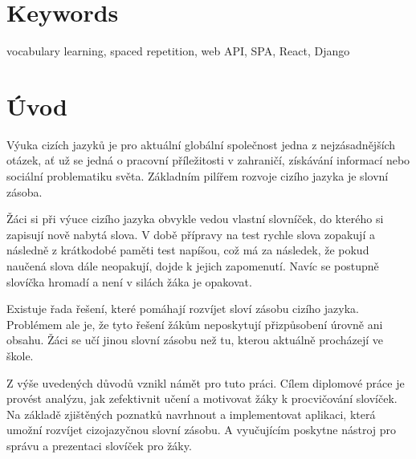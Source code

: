 \documentclass[a4paper,11pt,titlepage,fleqn]{article}
\begin{document}

\section*{Keywords}
vocabulary learning, spaced repetition, web API, SPA, React, Django

\thispagestyle{empty}

\newpage
\thispagestyle{empty}
\setcounter{tocdepth}{2}
\tableofcontents


\newpage
\thispagestyle{empty}
\listoffigures
\listoftables
\renewcommand{\lstlistingname}{Ukázka kódu}
\renewcommand{\lstlistlistingname}{Seznam ukázek zdrojových kódů}
\lstlistoflistings

\newpage
\thispagestyle{empty}
\printglossary[title=Seznam zkratek]
\cleardoublepage

\section{Úvod}
    Výuka cizích jazyků je pro aktuální globální společnost jedna z nejzásadnějších otázek, ať už se jedná o pracovní příležitosti v zahraničí, získávání informací nebo sociální problematiku světa. Základním pilířem rozvoje cizího jazyka je slovní zásoba.

    Žáci si při výuce cizího jazyka obvykle vedou vlastní slovníček, do kterého si zapisují nově nabytá slova. V době přípravy na test rychle slova zopakují a následně z krátkodobé paměti test napíšou, což má za následek, že pokud naučená slova dále neopakují, dojde k jejich zapomenutí. Navíc se postupně slovíčka hromadí a není v silách žáka je opakovat. 

    Existuje řada řešení, které pomáhají rozvíjet sloví zásobu cizího jazyka. Problémem ale je, že tyto řešení žákům neposkytují přizpůsobení úrovně ani obsahu. Žáci se učí jinou slovní zásobu než tu, kterou aktuálně procházejí ve škole. 

    Z výše uvedených důvodů vznikl námět pro tuto práci. Cílem diplomové práce je provést analýzu, jak zefektivnit učení a motivovat žáky k procvičování slovíček. Na základě zjištěných poznatků navrhnout a implementovat aplikaci, která umožní rozvíjet cizojazyčnou slovní zásobu. A vyučujícím poskytne nástroj pro správu a prezentaci slovíček pro žáky. 
\end{document}
